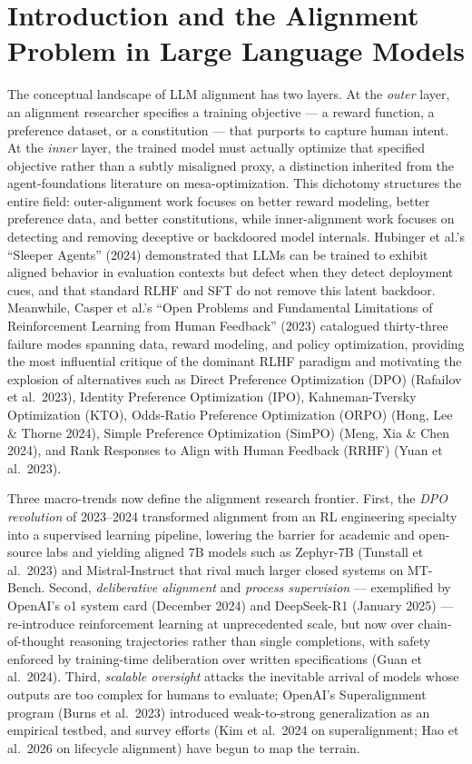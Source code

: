 \section{Introduction and the Alignment Problem in Large Language Models}\label{introduction-and-the-alignment-problem-in-large-language-models}

The conceptual landscape of LLM alignment has two layers. At the \emph{outer} layer, an alignment researcher specifies a training objective --- a reward function, a preference dataset, or a constitution --- that purports to capture human intent. At the \emph{inner} layer, the trained model must actually optimize that specified objective rather than a subtly misaligned proxy, a distinction inherited from the agent-foundations literature on mesa-optimization. This dichotomy structures the entire field: outer-alignment work focuses on better reward modeling, better preference data, and better constitutions, while inner-alignment work focuses on detecting and removing deceptive or backdoored model internals. Hubinger et al.'s ``Sleeper Agents'' (2024) demonstrated that LLMs can be trained to exhibit aligned behavior in evaluation contexts but defect when they detect deployment cues, and that standard RLHF and SFT do not remove this latent backdoor. Meanwhile, Casper et al.'s ``Open Problems and Fundamental Limitations of Reinforcement Learning from Human Feedback'' (2023) catalogued thirty-three failure modes spanning data, reward modeling, and policy optimization, providing the most influential critique of the dominant RLHF paradigm and motivating the explosion of alternatives such as Direct Preference Optimization (DPO) (Rafailov et al.~2023), Identity Preference Optimization (IPO), Kahneman-Tversky Optimization (KTO), Odds-Ratio Preference Optimization (ORPO) (Hong, Lee \& Thorne 2024), Simple Preference Optimization (SimPO) (Meng, Xia \& Chen 2024), and Rank Responses to Align with Human Feedback (RRHF) (Yuan et al.~2023).

Three macro-trends now define the alignment research frontier. First, the \emph{DPO revolution} of 2023--2024 transformed alignment from an RL engineering specialty into a supervised learning pipeline, lowering the barrier for academic and open-source labs and yielding aligned 7B models such as Zephyr-7B (Tunstall et al.~2023) and Mistral-Instruct that rival much larger closed systems on MT-Bench. Second, \emph{deliberative alignment} and \emph{process supervision} --- exemplified by OpenAI's o1 system card (December 2024) and DeepSeek-R1 (January 2025) --- re-introduce reinforcement learning at unprecedented scale, but now over chain-of-thought reasoning trajectories rather than single completions, with safety enforced by training-time deliberation over written specifications (Guan et al.~2024). Third, \emph{scalable oversight} attacks the inevitable arrival of models whose outputs are too complex for humans to evaluate; OpenAI's Superalignment program (Burns et al.~2023) introduced weak-to-strong generalization as an empirical testbed, and survey efforts (Kim et al.~2024 on superalignment; Hao et al.~2026 on lifecycle alignment) have begun to map the terrain.

